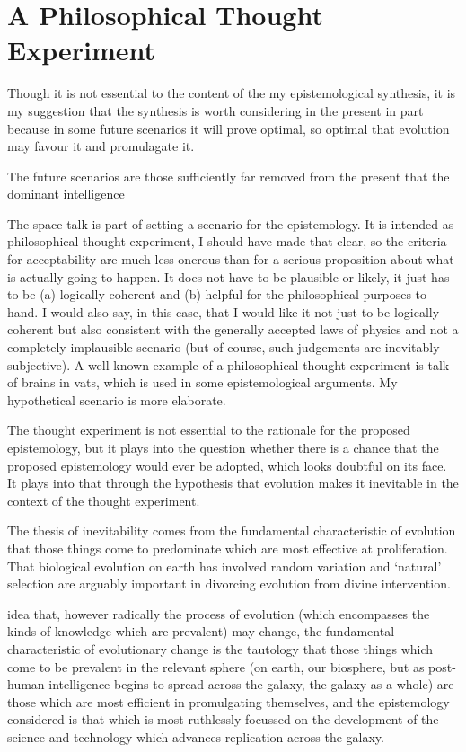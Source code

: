\documentclass[10pt,titlepage]{book}
\begin{document}
\section{A Philosophical Thought Experiment}

Though it is not essential to the content of the my epistemological synthesis, it is my suggestion that the synthesis is worth considering in the present in part because in some future scenarios it will prove optimal, so optimal that evolution may favour it and promulagate it.

The future scenarios are those sufficiently far removed from the present that the dominant  intelligence

The space talk is part of setting a scenario for the epistemology.
It is intended as philosophical thought experiment, I should have made that clear, so the criteria for acceptability are much less onerous than for a serious proposition about what is actually going to happen.
It does not have to be plausible or likely, it just has to be (a) logically coherent and (b) helpful for the philosophical purposes to hand.
I would also say, in this case, that I would like it not just to be logically coherent but also consistent with the generally accepted laws of physics and not a completely implausible scenario (but of course, such judgements are inevitably subjective).
A well known example of a philosophical thought experiment is talk of brains in vats, which is used in some epistemological arguments.
My hypothetical scenario is more elaborate.

The thought experiment is not essential to the rationale for the proposed epistemology, but it plays into the question whether there is a chance that the proposed epistemology would ever be adopted, which looks doubtful on its face.
It plays into that through the hypothesis that evolution makes it inevitable in the context of the thought experiment.

The thesis of inevitability comes from the fundamental characteristic of evolution that those things come to predominate which are most effective at proliferation.
That biological evolution on earth has involved random variation and `natural' selection are arguably important in divorcing evolution from divine intervention.


idea that, however radically the process of evolution (which encompasses the kinds of knowledge which are prevalent) may change, the fundamental characteristic of evolutionary change is the tautology that those things which come to be prevalent in the relevant sphere (on earth, our biosphere, but as post-human intelligence begins to spread across the galaxy, the galaxy as a whole) are those which are most efficient in promulgating themselves, and the epistemology considered is that which is most ruthlessly focussed on the development of the science and technology which advances replication across the galaxy.
\end{document}
